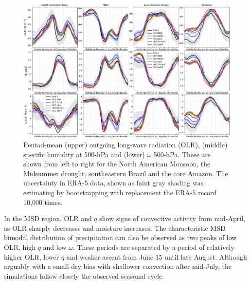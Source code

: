 \begin{figure}[t!]
\centering
 \includegraphics[width=\linewidth]{figures/fig9b.png}
\caption[Seasonal cycle of measures of convection in the AMS]{Pentad-mean (upper) outgoing long-wave radiation (OLR), (middle) specific humidity at 500-hPa and (lower) $\omega$ 500-hPa. These are shown from left to right for the North American Monsoon, the Midsummer drought, southeastern Brazil and the core Amazon. The uncertainty in ERA-5 data, shown as faint gray shading was estimating by bootstrapping with replacement the ERA-5 record 10,000 times. }
\label{fig:9}
\end{figure}

In the MSD region, OLR and $q$ show signs of convective activity from mid-April, as OLR sharply decreases and moisture increases.
The characteristic MSD bimodal distribution of precipitation can also be observed as two peaks of low OLR, high $q$ and low $\omega$.
These periods are separated by a period of relatively higher OLR, lower $q$ and weaker ascent from June 15 until late August.
Although arguably with a small dry bias with shallower convection after mid-July, the simulations follow closely the observed seasonal cycle.

